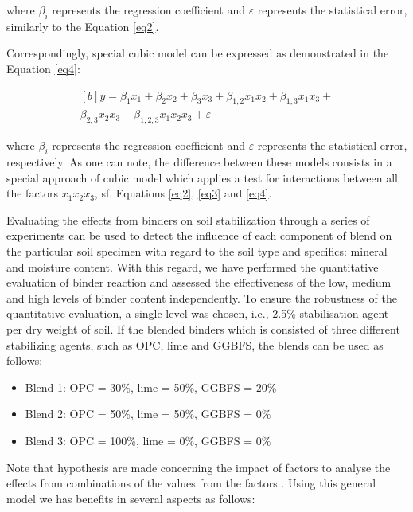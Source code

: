 \documentclass[eprint,
]{actapoly}
\begin{document}
where $\beta_i$ represents the regression coefficient and $\varepsilon$ represents the statistical error, similarly to the Equation \ref{eq2}.

Correspondingly, special cubic model can be expressed as demonstrated in the Equation \ref{eq4}:

\begin{equation}\label{eq4}
\begin{aligned}[b]
y=\beta_{1}x_{1}+\beta_{2}x_{2}+\beta_{3}x_{3}+\beta_{1,2}x_{1}x_{2}+\beta_{1,3}x_{1}x_{3}+\\\beta_{2,3}x_{2}x_{3}+\beta_{1,2,3}x_{1}x_{2}x_{3}+\varepsilon
\end{aligned}
\end{equation}

where $\beta_i$ represents the regression coefficient and $\varepsilon$ represents the statistical error, respectively. As one can note, the difference between these models consists in a special approach of cubic model which applies a test for interactions between all the factors $x_{1}x_{2}x_{3}$, sf. Equations \ref{eq2}, \ref{eq3} and \ref{eq4}.

Evaluating the effects from binders on soil stabilization through a series of experiments can be used to detect the influence of each component of blend on the particular soil specimen with regard to the soil type and specifics: mineral and moisture content. With this regard, we have performed the quantitative evaluation of binder reaction and assessed the effectiveness of the low, medium and high levels of binder content independently. To ensure the robustness of the quantitative evaluation, a single level was chosen, i.e., 2.5\% stabilisation agent per dry weight of soil. If the blended binders which is consisted of three different stabilizing agents, such as OPC, lime and GGBFS, the blends can be used as follows:

\begin{itemize}
	\item [--] Blend 1: OPC = 30\%, lime = 50\%, GGBFS = 20\%
	\item [--] Blend 2: OPC = 50\%, lime = 50\%, GGBFS = 0\%
	\item [--] Blend 3: OPC = 100\%, lime = 0\%, GGBFS = 0\%
\end{itemize}

Note that hypothesis are made concerning the impact of factors to analyse the effects from combinations of the values from the factors \cite{StatSoft}. Using this general model we has benefits in several aspects as follows:
\end{document}
